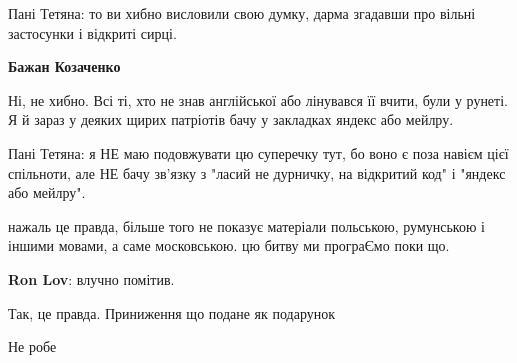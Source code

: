\begin{itemize}
\begin{itemize}
\begin{itemize}

Пані Тетяна: то ви хибно висловили свою думку, дарма згадавши про вільні
застосунки і відкриті сирці.

\textbf{Бажан Козаченко} 

Ні, не хибно. Всі ті, хто не знав англійської або лінувався її вчити, були у
рунеті. Я й зараз у деяких щирих патріотів бачу у закладках яндекс або мейлру.


Пані Тетяна: я НЕ маю подовжувати цю суперечку тут, бо воно є поза навієм цієї
спільноти, але НЕ бачу зв'язку з "ласий не дурничку, на відкритий код" і
"яндекс або мейлру".

\end{itemize} %

\end{itemize} %


нажаль це правда, більше того не показує матеріали польською, румунською і
іншими мовами, а саме московською. цю битву ми програЄмо поки що.

\begin{itemize} %
\textbf{Ron Lov}: влучно помітив.
\end{itemize} %

Так, це правда. Приниження що подане як подарунок

Не робе

\end{itemize} %

